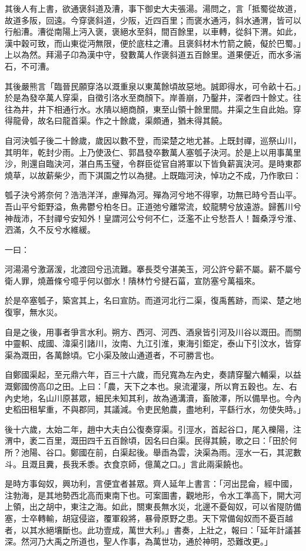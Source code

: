 \begin{pinyinscope}
其後人有上書，欲通褒斜道及漕，事下御史大夫張湯。湯問之，言「抵蜀從故道，故道多阪，回遠。今穿褒斜道，少阪，近四百里；而褒水通沔，斜水通渭，皆可以行船漕。漕從南陽上沔入褒，褒絕水至斜，間百餘里，以車轉，從斜下渭。如此，漢中穀可致，而山東從沔無限，便於底柱之漕。且褒斜材木竹箭之饒，儗於巴蜀。」上以為然。拜湯子卬為漢中守，發數萬人作褒斜道五百餘里。道果便近，而水多湍石，不可漕。

其後嚴熊言「臨晉民願穿洛以溉重泉以東萬餘頃故惡地。誠即得水，可令畝十石。」於是為發卒萬人穿渠，自徵引洛水至商顏下。岸善崩，乃鑿井，深者四十餘丈。往往為井，井下相通行水。水隤以絕商顏，東至山領十餘里間。井渠之生自此始。穿得龍骨，故名曰龍首渠。作之十餘歲，渠頗通，猶未得其饒。

自河決瓠子後二十餘歲，歲因以數不登，而梁楚之地尤甚。上既封禪，巡祭山川，其明年，乾封少雨。上乃使汲仁、郭昌發卒數萬人塞瓠子決河。於是上以用事萬里沙，則還自臨決河，湛白馬玉璧，令群臣從官自將軍以下皆負薪寘決河。是時東郡燒草，以故薪柴少，而下淇園之竹以為揵。上既臨河決，悼功之不成，乃作歌曰：

瓠子決兮將奈何？浩浩洋洋，慮殫為河。殫為河兮地不得寧，功無已時兮吾山平。吾山平兮鉅野溢，魚弗鬱兮柏冬日。正道弛兮離常流，蛟龍騁兮放遠游。歸舊川兮神哉沛，不封禪兮安知外！皇謂河公兮何不仁，泛濫不止兮愁吾人！齧桑浮兮淮、泗滿，久不反兮水維緩。

一曰：

河湯湯兮激潺湲，北渡回兮迅流難。搴長茭兮湛美玉，河公許兮薪不屬。薪不屬兮衛人罪，燒蕭條兮噫乎何以御水！隤林竹兮揵石菑，宣防塞兮萬福來。

於是卒塞瓠子，築宮其上，名曰宣防。而道河北行二渠，復禹舊跡，而梁、楚之地復寧，無水災。

自是之後，用事者爭言水利。朔方、西河、河西、酒泉皆引河及川谷以溉田。而關中靈軹、成國、湋渠引諸川，汝南、九江引淮，東海引鉅定，泰山下引汶水，皆穿渠為溉田，各萬餘頃。它小渠及陂山通道者，不可勝言也。

自鄭國渠起，至元鼎六年，百三十六歲，而兒寬為左內史，奏請穿鑿六輔渠，以益溉鄭國傍高卬之田。上曰：「農，天下之本也。泉流灌寖，所以育五穀也。左、右內史地，名山川原甚眾，細民未知其利，故為通溝瀆，畜陂澤，所以備旱也。今內史稻田租挈重，不與郡同，其議減。令吏民勉農，盡地利，平繇行水，勿使失時。」

後十六歲，太始二年，趙中大夫白公復奏穿渠。引涇水，首起谷口，尾入櫟陽，注渭中，袤二百里，溉田四千五百餘頃，因名曰白渠。民得其饒，歌之曰：「田於何所？池陽、谷口。鄭國在前，白渠起後。舉臿為雲，決渠為雨。涇水一石，其泥數斗。且溉且糞，長我禾黍。衣食京師，億萬之口。」言此兩渠饒也。

是時方事匈奴，興功利，言便宜者甚眾。齊人延年上書言：「河出昆侖，經中國，注勃海，是其地勢西北高而東南下也。可案圖書，觀地形，令水工準高下，開大河上領，出之胡中，東注之海。如此，關東長無水災，北邊不憂匈奴，可以省隄防備塞，士卒轉輸，胡寇侵盜，覆軍殺將，暴骨原野之患。天下常備匈奴而不憂百越者，以其水絕壤斷也。此功壹成，萬世大利。」書奏，上壯之，報曰：「延年計議甚深。然河乃大禹之所道也，聖人作事，為萬世功，通於神明，恐難改更。」


\end{pinyinscope}
